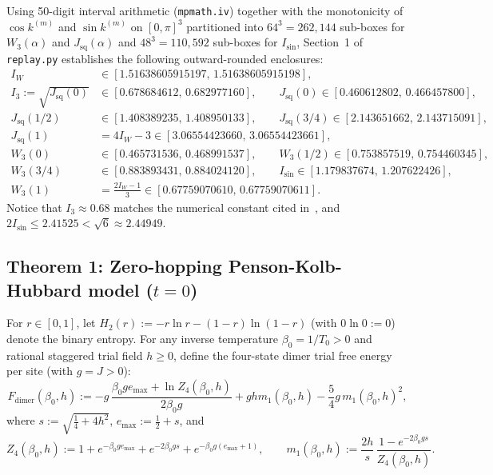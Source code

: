 \documentclass[11pt]{article}
\theoremstyle{definition}
\theoremstyle{remark}
\begin{document}
Using 50-digit interval arithmetic (\texttt{mpmath.iv}) together with the monotonicity of $\cos k^{(m)}$ and $\sin k^{(m)}$ on $[0, \pi]^3$ partitioned into $64^3 = 262{,}144$ sub-boxes for $W_3(\alpha)$ and $J_{\mathrm{sq}}(\alpha)$ and $48^3 = 110{,}592$ sub-boxes for $I_{\sin}$, Section~1 of \texttt{replay.py} establishes the following outward-rounded enclosures:
\begin{align}
I_W &\in [1.51638605915197,\, 1.51638605915198], \label{eq:IW-val}\\
I_3 := \sqrt{J_{\mathrm{sq}}(0)} &\in [0.678684612,\, 0.682977160], \qquad J_{\mathrm{sq}}(0) \in [0.460612802,\, 0.466457800], \label{eq:I3-val}\\
J_{\mathrm{sq}}(1/2) &\in [1.408389235,\, 1.408950133], \qquad J_{\mathrm{sq}}(3/4) \in [2.143651662,\, 2.143715091], \label{eq:Jsq-mid-val}\\
J_{\mathrm{sq}}(1) &= 4 I_W - 3 \in [3.06554423660,\, 3.06554423661], \label{eq:Jsq-1-val}\\
W_3(0) &\in [0.465731536,\, 0.468991537], \qquad W_3(1/2) \in [0.753857519,\, 0.754460345], \label{eq:W3-0-val}\\
W_3(3/4) &\in [0.883893431,\, 0.884024120], \qquad I_{\sin} \in [1.179837674,\, 1.207622426], \label{eq:Isin-val}\\
W_3(1) &= \frac{2I_W - 1}{3} \in [0.67759070610,\, 0.67759070611]. \label{eq:W3-1-val}
\end{align}
Notice that $I_3 \approx 0.68$ matches the numerical constant cited in~\cite{koma2022}, and $2 I_{\sin} \le 2.41525 < \sqrt{6} \approx 2.44949$.

\subsection{Theorem 1: Zero-hopping Penson-Kolb-Hubbard model (\texorpdfstring{$t = 0$}{t = 0})}\label{subsec:thm1}

For $r \in [0, 1]$, let $H_2(r) := -r\ln r - (1-r)\ln(1-r)$ (with $0\ln 0 := 0$) denote the binary entropy. For any inverse temperature $\beta_0 = 1/T_0 > 0$ and rational staggered trial field $h \ge 0$, define the four-state dimer trial free energy per site (with $g = J > 0$):
\begin{equation}\label{eq:F-dimer-def}
F_{\mathrm{dimer}}(\beta_0, h) := -g\,\frac{\beta_0 g e_{\max} + \ln Z_4(\beta_0, h)}{2\beta_0 g} + g h m_1(\beta_0, h) - \frac{5}{4}g\,m_1(\beta_0, h)^2,
\end{equation}
where $s := \sqrt{\frac{1}{4} + 4h^2}$, $e_{\max} := \frac{1}{2} + s$, and
\begin{equation}\label{eq:Z4-m1-def}
Z_4(\beta_0, h) := 1 + e^{-\beta_0 g e_{\max}} + e^{-2\beta_0 g s} + e^{-\beta_0 g(e_{\max} + 1)}, \qquad m_1(\beta_0, h) := \frac{2h}{s}\,\frac{1 - e^{-2\beta_0 g s}}{Z_4(\beta_0, h)}.
\end{equation}
\end{document}
